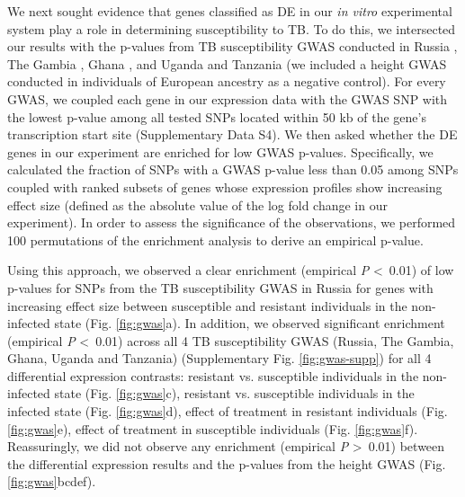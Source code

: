 \documentclass[fleqn,10pt]{wlscirep}
\begin{document}
We next sought evidence that genes classified as DE in our \emph{in
vitro} experimental system play a role in determining susceptibility
to TB. To do this, we intersected our results with the p-values from
TB susceptibility GWAS conducted in Russia \cite{Curtis2015}, The
Gambia \cite{Thye2010},  Ghana \cite{Thye2010}, and Uganda and
Tanzania \cite{Sobota2016} (we included a height GWAS conducted in
individuals of European ancestry \cite{LangoAllen2010} as a negative
control). For every GWAS, we coupled each gene in our expression data
with the GWAS SNP with the lowest p-value among all tested SNPs
located within 50 kb of the gene’s transcription start site
(Supplementary Data S4). We then asked whether the DE genes in our
experiment are enriched for low GWAS p-values. Specifically, we
calculated the fraction of SNPs with a GWAS p-value less than 0.05
among SNPs coupled with ranked subsets of genes whose expression
profiles show increasing effect size (defined as the absolute value of
the log fold change in our experiment). In order to assess the
significance of the observations, we performed 100 permutations of the
enrichment analysis to derive an empirical p-value.

Using this approach, we observed a clear enrichment (empirical
\emph{P} \textless \, 0.01) of low p-values for SNPs from the TB
susceptibility GWAS in Russia for genes with increasing effect size
between susceptible and resistant individuals in the non-infected
state (Fig. \ref{fig:gwas}a). In addition, we observed significant
enrichment (empirical \emph{P} \textless \, 0.01) across all 4 TB
susceptibility GWAS (Russia, The Gambia, Ghana, Uganda and Tanzania)
(Supplementary Fig. \ref{fig:gwas-supp}) for all 4 differential
expression contrasts: resistant vs. susceptible individuals in the
non-infected state (Fig. \ref{fig:gwas}c), resistant vs. susceptible
individuals in the infected state (Fig. \ref{fig:gwas}d), effect of
treatment in resistant individuals (Fig. \ref{fig:gwas}e), effect of
treatment in susceptible individuals (Fig. \ref{fig:gwas}f).
Reassuringly, we did not observe any enrichment (empirical \emph{P}
\textgreater \, 0.01) between the differential expression results and
the p-values from the height GWAS (Fig. \ref{fig:gwas}bcdef).
\end{document}
